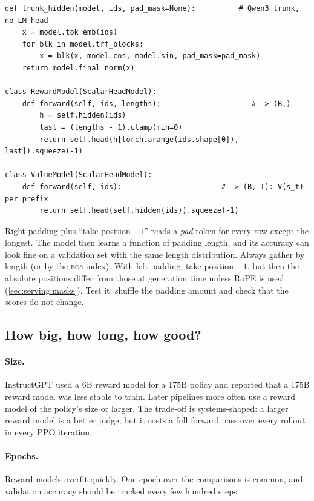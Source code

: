 \begin{lstlisting}[caption={A reward model and a value model share one trunk class; they differ only in which positions they read (\ident{llmsys/rlhf/models.py}).},label={lst:rlhf:models}]
def trunk_hidden(model, ids, pad_mask=None):          # Qwen3 trunk, no LM head
    x = model.tok_emb(ids)
    for blk in model.trf_blocks:
        x = blk(x, model.cos, model.sin, pad_mask=pad_mask)
    return model.final_norm(x)

class RewardModel(ScalarHeadModel):
    def forward(self, ids, lengths):                     # -> (B,)
        h = self.hidden(ids)
        last = (lengths - 1).clamp(min=0)
        return self.head(h[torch.arange(ids.shape[0]), last]).squeeze(-1)

class ValueModel(ScalarHeadModel):
    def forward(self, ids):                       # -> (B, T): V(s_t) per prefix
        return self.head(self.hidden(ids)).squeeze(-1)
\end{lstlisting}

\begin{pitfall}
Right padding plus ``take position $-1$'' reads a \emph{pad} token for every row except the longest.
The model then learns a function of padding length, and its accuracy can look fine on a
validation set with the same length distribution. Always gather by length (or by the \textsc{eos}
index). With left padding, take position $-1$, but then the absolute positions differ from those
at generation time unless RoPE is used (\cref{sec:serving:masks}). Test it: shuffle the padding
amount and check that the scores do not change.
\end{pitfall}

\subsection{How big, how long, how good?}

\paragraph{Size.} InstructGPT used a 6B reward model for a 175B policy and reported that a 175B
reward model was less stable to train. Later pipelines more often use a reward model of the
policy's size or larger. The trade-off is systems-shaped: a larger reward model is a better judge, but it costs
a full forward pass over every rollout in every PPO iteration.

\paragraph{Epochs.} Reward models overfit quickly. One epoch over the comparisons is common, and
validation accuracy should be tracked every few hundred steps.

